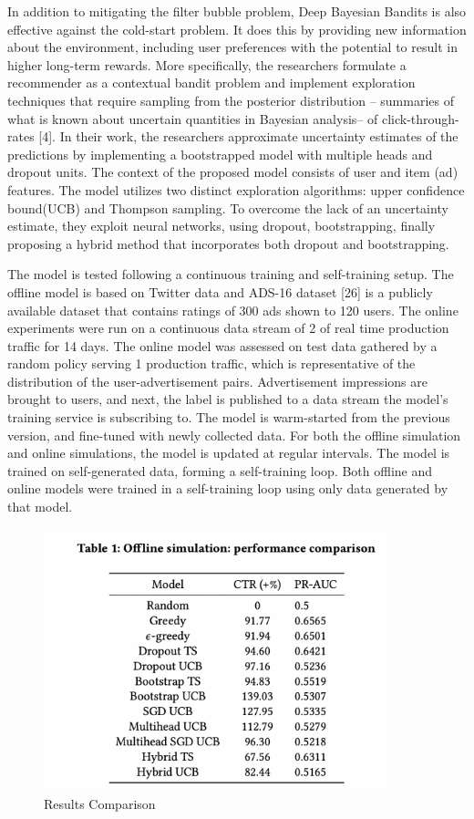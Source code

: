 In addition to mitigating the filter bubble problem, Deep Bayesian Bandits is also effective against the cold-start problem. It does this by providing new information about the environment, including user preferences with the potential to result in  higher long-term rewards. More specifically, the researchers formulate a recommender as a contextual bandit problem and implement exploration techniques that require sampling from the posterior distribution -- summaries of what is known about uncertain quantities in Bayesian analysis-- of click-through-rates [4]. In their work, the researchers approximate uncertainty estimates of the predictions by implementing a bootstrapped model with multiple heads and dropout units. The context of the proposed model consists of user and item (ad) features. The model utilizes two distinct exploration algorithms: upper confidence bound(UCB) and Thompson sampling. To overcome the lack of an uncertainty estimate, they exploit neural networks, using dropout, bootstrapping, finally proposing a hybrid method that incorporates both dropout and bootstrapping. 

The model is tested following a continuous training and self-training setup. The offline model is based on Twitter data and ADS-16 dataset [26] is a publicly available dataset
that contains ratings of 300 ads shown to 120 users. The online experiments were run on a continuous data stream of 2\text{\%} of real time production traffic for 14 days. The online model was assessed on test data gathered by a random policy serving 1\text{\%} production traffic, which is representative of the distribution of the user-advertisement pairs.  Advertisement impressions are brought to users, and next, the label is published to a data stream the model’s training service is subscribing to. The model is warm-started from the previous version, and fine-tuned with newly collected data. For both the offline simulation and online simulations, the model is updated at regular intervals. The model is trained on self-generated data, forming a self-training loop. Both offline and online models were trained in a self-training loop using only data generated by that model. 

\begin{figure}[hh!]
    \centering
    \includegraphics[width=100mm]{bandits_results.png}
    \caption{Results Comparison
    \label{overflow}}
\end{figure}

